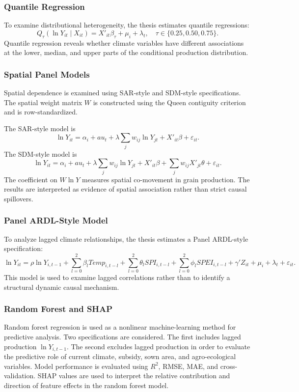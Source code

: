 \documentclass[12pt,a4paper]{article}
\begin{document}
\subsubsection{Quantile Regression}

To examine distributional heterogeneity, the thesis estimates quantile regressions:
\[
Q_{\tau}(\ln Y_{it}\mid X_{it})
=
X'_{it}\beta_{\tau}+\mu_i+\lambda_t,
\quad
\tau\in\{0.25,0.50,0.75\}.
\]
Quantile regression reveals whether climate variables have different associations at the lower, median, and upper parts of the conditional production distribution.

\subsubsection{Spatial Panel Models}

Spatial dependence is examined using SAR-style and SDM-style specifications. The spatial weight matrix \(W\) is constructed using the Queen contiguity criterion and is row-standardized.

The SAR-style model is
\[
\ln Y_{it}
=
\alpha_i+	au_t+\lambda \sum_j w_{ij}\ln Y_{jt}
+X'_{it}\beta+\varepsilon_{it}.
\]
The SDM-style model is
\[
\ln Y_{it}
=
\alpha_i+	au_t+\lambda \sum_j w_{ij}\ln Y_{jt}
+X'_{it}\beta
+\sum_j w_{ij}X'_{jt}\theta
+\varepsilon_{it}.
\]
The coefficient on \(W\ln Y\) measures spatial co-movement in grain production. The results are interpreted as evidence of spatial association rather than strict causal spillovers.

\subsubsection{Panel ARDL-Style Model}

To analyze lagged climate relationships, the thesis estimates a Panel ARDL-style specification:
\[
\ln Y_{it}
=
\rho \ln Y_{i,t-1}
+
\sum_{l=0}^{2}\beta_l Temp_{i,t-l}
+
\sum_{l=0}^{2}\theta_l SPI_{i,t-l}
+
\sum_{l=0}^{2}\phi_l SPEI_{i,t-l}
+\gamma'Z_{it}
+\mu_i+\lambda_t+\varepsilon_{it}.
\]
This model is used to examine lagged correlations rather than to identify a structural dynamic causal mechanism.

\subsubsection{Random Forest and SHAP}

Random forest regression is used as a nonlinear machine-learning method for predictive analysis. Two specifications are considered. The first includes lagged production \(\ln Y_{i,t-1}\). The second excludes lagged production in order to evaluate the predictive role of current climate, subsidy, sown area, and agro-ecological variables. Model performance is evaluated using \(R^2\), RMSE, MAE, and cross-validation. SHAP values are used to interpret the relative contribution and direction of feature effects in the random forest model.
\end{document}
